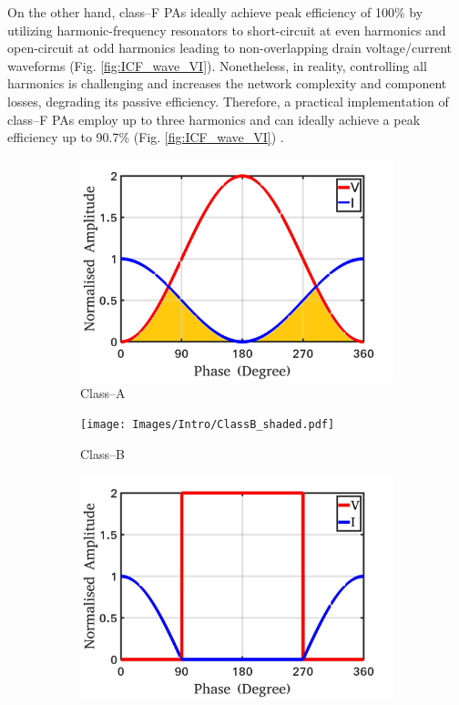 \documentclass[conference]{IEEEtran}
\begin{document}
On the other hand, class--F PAs ideally achieve peak efficiency of 100\% by utilizing harmonic-frequency resonators to short-circuit at even harmonics and open-circuit at odd harmonics leading to non-overlapping drain voltage/current waveforms (Fig. \ref{fig:ICF_wave_VI}). Nonetheless, in reality, controlling all harmonics is challenging and increases the network complexity and component losses, degrading its passive efficiency. Therefore, a practical implementation of class--F PAs employ up to three harmonics and can ideally achieve a peak efficiency up to 90.7\% (Fig. \ref{fig:ICF_wave_VI}) \cite{Raab_max_eff}.
\begin{figure}[!t]
\centering
\captionsetup{font=footnotesize}
\begin{subfigure}{0.24\textwidth}
\includegraphics[width=1\textwidth]{Images/Intro/ClassA_shaded.pdf}
\caption{Class--A}
\label{fig:CA_wave_VI}
\end{subfigure}
\begin{subfigure}{0.24\textwidth}
\texttt{[image: Images/Intro/ClassB\_shaded.pdf]}
\caption{Class--B}
\label{fig:CB_wave_VI}
\end{subfigure}
\begin{subfigure}{0.24\textwidth}
\includegraphics[width=1\textwidth]{Images/Intro/ClassF.pdf}

\end{subfigure}
\end{figure}
\end{document}
